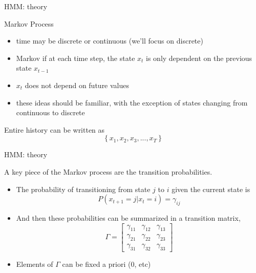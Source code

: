 \documentclass[
  ignorenonframetext,
]{beamer}
\providecommand{\tightlist}{%
  \setlength{\itemsep}{0pt}\setlength{\parskip}{0pt}}
\begin{document}
\begin{frame}{HMM: theory}
\protect\hypertarget{hmm-theory}{}

Markov Process

\begin{itemize}
\tightlist
\item
  time may be discrete or continuous (we'll focus on discrete)
\item
  Markov if at each time step, the state \(x_{t}\) is only dependent on
  the previous state \(x_{t-1}\)
\item
  \(x_{t}\) does not depend on future values
\item
  these ideas should be familiar, with the exception of states changing
  from continuous to discrete
\end{itemize}

Entire history can be written as
\[\left\{ { x }_{ 1 },{ x }_{ 2 },{ x }_{ 3 },...,{ x }_{ T } \right\}\]

\end{frame}

\begin{frame}{HMM: theory}
\protect\hypertarget{hmm-theory-1}{}

A key piece of the Markov process are the transition probabilities.

\begin{itemize}
\item
  The probability of transitioning from state \(j\) to \(i\) given the
  current state is
  \[P\left( { x }_{ t+1 }=j | { x }_{ t }=i \right) ={ \gamma  }_{ ij }\]
\item
  And then these probabilities can be summarized in a transition matrix,
  \[\Gamma =\left[ \begin{matrix} { \gamma  }_{ 11 } & { \gamma  }_{ 12 } & { \gamma  }_{ 13 } \\ { \gamma  }_{ 21 } & { \gamma  }_{ 22 } & { \gamma  }_{ 23 } \\ { \gamma  }_{ 31 } & { \gamma  }_{ 32 } & { \gamma  }_{ 33 } \end{matrix} \right]\]
\item
  Elements of \(\Gamma\) can be fixed a priori (0, etc)
\end{itemize}

\end{frame}
\end{document}
